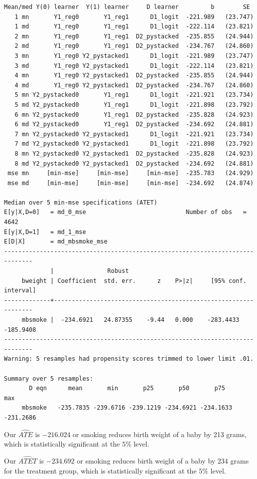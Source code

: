 \documentclass[
]{book}
\begin{document}
\begin{verbatim}
Mean/med Y(0) learner  Y(1) learner     D learner         b        SE 
   1 mn       Y1_reg0       Y1_reg1      D1_logit  -221.989   (23.747)
   1 md       Y1_reg0       Y1_reg1      D1_logit  -222.114   (23.821)
   2 mn       Y1_reg0       Y1_reg1  D2_pystacked  -235.855   (24.944)
   2 md       Y1_reg0       Y1_reg1  D2_pystacked  -234.767   (24.860)
   3 mn       Y1_reg0 Y2_pystacked1      D1_logit  -221.989   (23.747)
   3 md       Y1_reg0 Y2_pystacked1      D1_logit  -222.114   (23.821)
   4 mn       Y1_reg0 Y2_pystacked1  D2_pystacked  -235.855   (24.944)
   4 md       Y1_reg0 Y2_pystacked1  D2_pystacked  -234.767   (24.860)
   5 mn Y2_pystacked0       Y1_reg1      D1_logit  -221.921   (23.734)
   5 md Y2_pystacked0       Y1_reg1      D1_logit  -221.898   (23.792)
   6 mn Y2_pystacked0       Y1_reg1  D2_pystacked  -235.828   (24.923)
   6 md Y2_pystacked0       Y1_reg1  D2_pystacked  -234.692   (24.881)
   7 mn Y2_pystacked0 Y2_pystacked1      D1_logit  -221.921   (23.734)
   7 md Y2_pystacked0 Y2_pystacked1      D1_logit  -221.898   (23.792)
   8 mn Y2_pystacked0 Y2_pystacked1  D2_pystacked  -235.828   (24.923)
   8 md Y2_pystacked0 Y2_pystacked1  D2_pystacked  -234.692   (24.881)
 mse mn     [min-mse]     [min-mse]     [min-mse]  -235.783   (24.929)
 mse md     [min-mse]     [min-mse]     [min-mse]  -234.692   (24.874)

Median over 5 min-mse specifications (ATET)
E[y|X,D=0]   = md_0_mse                            Number of obs   =      4642
E[y|X,D=1]   = md_1_mse
E[D|X]       = md_mbsmoke_mse
------------------------------------------------------------------------------
             |               Robust
     bweight | Coefficient  std. err.      z    P>|z|     [95% conf. interval]
-------------+----------------------------------------------------------------
     mbsmoke |  -234.6921   24.87355    -9.44   0.000    -283.4433   -185.9408
------------------------------------------------------------------------------
Warning: 5 resamples had propensity scores trimmed to lower limit .01.

Summary over 5 resamples:
       D eqn      mean       min       p25       p50       p75       max
     mbsmoke   -235.7835 -239.6716 -239.1219 -234.6921 -234.1633 -231.2686
\end{verbatim}

Our \(\widehat{ATE}\) is \(-216.024\) or smoking reduces birth weight of a baby by 213 grams, which is statistically significant at the \(5\%\) level.

Our \(\widehat{ATET}\) is \(-234.692\) or smoking reduces birth weight of a baby by 234 grams for the treatment group, which is statistically significant at the \(5\%\) level.
\end{document}
